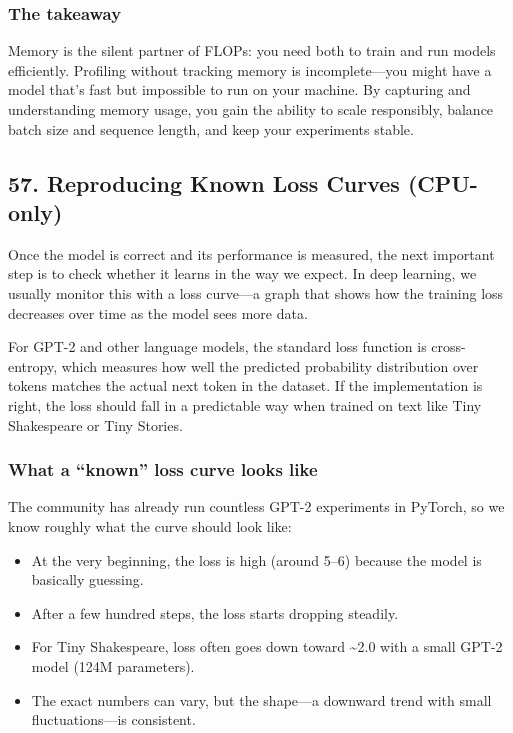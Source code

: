 \documentclass[
  letterpaper,
  DIV=11,
  numbers=noendperiod]{scrreprt}
\providecommand{\tightlist}{%
  \setlength{\itemsep}{0pt}\setlength{\parskip}{0pt}}
\begin{document}
\subsubsection{The takeaway}\label{the-takeaway-45}

Memory is the silent partner of FLOPs: you need both to train and run
models efficiently. Profiling without tracking memory is
incomplete---you might have a model that's fast but impossible to run on
your machine. By capturing and understanding memory usage, you gain the
ability to scale responsibly, balance batch size and sequence length,
and keep your experiments stable.

\subsection{57. Reproducing Known Loss Curves
(CPU-only)}\label{reproducing-known-loss-curves-cpu-only}

Once the model is correct and its performance is measured, the next
important step is to check whether it learns in the way we expect. In
deep learning, we usually monitor this with a loss curve---a graph that
shows how the training loss decreases over time as the model sees more
data.

For GPT-2 and other language models, the standard loss function is
cross-entropy, which measures how well the predicted probability
distribution over tokens matches the actual next token in the dataset.
If the implementation is right, the loss should fall in a predictable
way when trained on text like Tiny Shakespeare or Tiny Stories.

\subsubsection{What a ``known'' loss curve looks
like}\label{what-a-known-loss-curve-looks-like}

The community has already run countless GPT-2 experiments in PyTorch, so
we know roughly what the curve should look like:

\begin{itemize}
\tightlist
\item
  At the very beginning, the loss is high (around 5--6) because the
  model is basically guessing.
\item
  After a few hundred steps, the loss starts dropping steadily.
\item
  For Tiny Shakespeare, loss often goes down toward \textasciitilde2.0
  with a small GPT-2 model (124M parameters).
\item
  The exact numbers can vary, but the shape---a downward trend with
  small fluctuations---is consistent.
\end{itemize}
\end{document}
